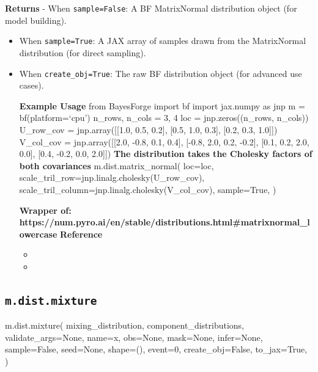 \documentclass[
  letterpaper,
  DIV=11,
  numbers=noendperiod]{scrartcl}
\newenvironment{Shaded}{\begin{snugshade}}{\end{snugshade}}
\newcommand{\DecValTok}[1]{\textcolor[rgb]{0.68,0.00,0.00}{#1}}
\newcommand{\NormalTok}[1]{\textcolor[rgb]{0.00,0.23,0.31}{#1}}
\newcommand{\OperatorTok}[1]{\textcolor[rgb]{0.37,0.37,0.37}{#1}}
\newcommand{\StringTok}[1]{\textcolor[rgb]{0.13,0.47,0.30}{#1}}
\newcommand{\VariableTok}[1]{\textcolor[rgb]{0.07,0.07,0.07}{#1}}
\providecommand{\tightlist}{%
  \setlength{\itemsep}{0pt}\setlength{\parskip}{0pt}}\usepackage{longtable,booktabs,array}
\begin{document}
\textbf{Returns} - When \texttt{sample=False}: A BF MatrixNormal
distribution object (for model building).

\begin{itemize}
\item
  When \texttt{sample=True}: A JAX array of samples drawn from the
  MatrixNormal distribution (for direct sampling).
\item
  When \texttt{create\_obj=True}: The raw BF distribution object (for
  advanced use cases).

  \textbf{Example Usage} from BayesForge import bf import jax.numpy as
  jnp m = bf(platform=`cpu') n\_rows, n\_cols = 3, 4 loc =
  jnp.zeros((n\_rows, n\_cols)) U\_row\_cov = jnp.array({[}{[}1.0, 0.5,
  0.2{]}, {[}0.5, 1.0, 0.3{]}, {[}0.2, 0.3, 1.0{]}{]}) V\_col\_cov =
  jnp.array({[}{[}2.0, -0.8, 0.1, 0.4{]}, {[}-0.8, 2.0, 0.2, -0.2{]},
  {[}0.1, 0.2, 2.0, 0.0{]}, {[}0.4, -0.2, 0.0, 2.0{]}{]}) \textbf{The
  distribution takes the Cholesky factors of both covariances}
  m.dist.matrix\_normal( loc=loc,
  scale\_tril\_row=jnp.linalg.cholesky(U\_row\_cov),
  scale\_tril\_column=jnp.linalg.cholesky(V\_col\_cov), sample=True, )

  \textbf{Wrapper of:
  https://num.pyro.ai/en/stable/distributions.html\#matrixnormal\_lowercase}
  \textbf{Reference}

  \begin{itemize}
  \tightlist
  \item
  \item
  \end{itemize}
\end{itemize}

\subsection{\texorpdfstring{\texttt{m.dist.mixture}}{m.dist.mixture}}\label{mixture}

\begin{Shaded}
\begin{Highlighting}[]
\NormalTok{m.dist.mixture(}
\NormalTok{    mixing\_distribution,}
\NormalTok{    component\_distributions,}
\NormalTok{    validate\_args}\OperatorTok{=}\VariableTok{None}\NormalTok{,}
\NormalTok{    name}\OperatorTok{=}\StringTok{\textquotesingle{}x\textquotesingle{}}\NormalTok{,}
\NormalTok{    obs}\OperatorTok{=}\VariableTok{None}\NormalTok{,}
\NormalTok{    mask}\OperatorTok{=}\VariableTok{None}\NormalTok{,}
\NormalTok{    infer}\OperatorTok{=}\VariableTok{None}\NormalTok{,}
\NormalTok{    sample}\OperatorTok{=}\VariableTok{False}\NormalTok{,}
\NormalTok{    seed}\OperatorTok{=}\VariableTok{None}\NormalTok{,}
\NormalTok{    shape}\OperatorTok{=}\NormalTok{(),}
\NormalTok{    event}\OperatorTok{=}\DecValTok{0}\NormalTok{,}
\NormalTok{    create\_obj}\OperatorTok{=}\VariableTok{False}\NormalTok{,}
\NormalTok{    to\_jax}\OperatorTok{=}\VariableTok{True}\NormalTok{,}
\NormalTok{)}
\end{Highlighting}
\end{Shaded}
\end{document}
